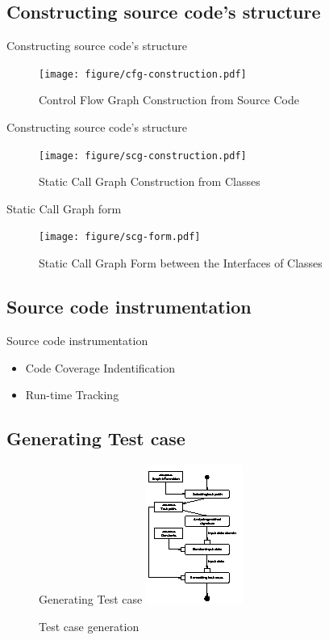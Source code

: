 \documentclass{beamer}
\begin{document}
\subsection{Constructing source code's structure}
\begin{frame}{Constructing source code's structure}
    \begin{figure}
        \texttt{[image: figure/cfg-construction.pdf]}
        \caption{Control Flow Graph Construction from Source Code}
        \label{fig:cfgConstruct}
    \end{figure}
\end{frame}

\begin{frame}{Constructing source code's structure}
    \begin{figure}
        \texttt{[image: figure/scg-construction.pdf]}
        \caption{Static Call Graph Construction from Classes}
        \label{fig:scgConstruct}
    \end{figure}
\end{frame}

\begin{frame}{Static Call Graph form}
    \begin{figure}
        \texttt{[image: figure/scg-form.pdf]}
        \caption{Static Call Graph Form between the Interfaces of Classes}
        \label{fig:scgForm}
    \end{figure}
\end{frame}

\subsection{Source code instrumentation}
\begin{frame}{Source code instrumentation}
    \begin{itemize}
        \item<1-> Code Coverage Indentification
        \item<2-> Run-time Tracking
    \end{itemize}
\end{frame}

\subsection{Generating Test case}
\begin{frame}
    \begin{figure}{Generating Test case}
        \includegraphics[height=.8\paperheight]{figure/Activities}
        \caption{Test case generation}
        \label{fig:testcasegenearation}
    \end{figure}
\end{frame}
\end{document}
